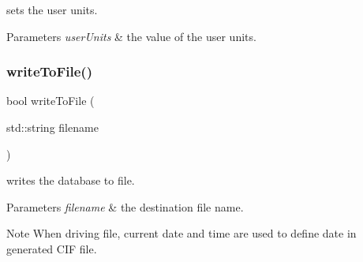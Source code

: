sets the user units. 


\begin{DoxyParams}{Parameters}
{\em user\+Units} & the value of the user units. \\
\hline
\end{DoxyParams}
\mbox{\label{class_a_g_d_s_1_1_library_a33b9d989b84857f46034085664ff3fa2}} 
\subsubsection{\texorpdfstring{write\+To\+File()}{writeToFile()}}
{\footnotesize\ttfamily bool write\+To\+File (\begin{DoxyParamCaption}\item[{std\+::string}]{filename }\end{DoxyParamCaption})}



writes the database to file. 


\begin{DoxyParams}{Parameters}
{\em filename} & the destination file name.\\
\hline
\end{DoxyParams}
\begin{DoxyNote}{Note}
When driving file, current date and time are used to define date in generated C\+IF file. 
\end{DoxyNote}
